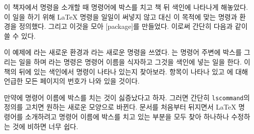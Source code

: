 이 책자에서 명령을 소개할 때 명령어에 박스를 치고 책 뒤 색인에 나타나게 해놓았다.
이 일을 하기 위해 \LaTeX{} 명령을 일일이 써넣지 않고 대신
이 목적에 맞는 명령과 환경을 정의했다. 
그리고 이것을 모아 [package]를 만들었다.
이로써 간단히 다음과 같이 쓸 수 있다.

\begin{example}
\begin{lscommand}
\end{lscommand}
\end{example}

이 예제에 라는 새로운 환경과 라는 새로운 명령을 쓰였다.
는 명령어 주변에 박스를 그리는 일을 하며
라는 명령은 명령어 이름을 식자하고 그것을 색인에 넣는 일을 한다.
이 책의 뒤에 있는 색인에서  명령이 나타나 있는지 찾아보라.  항목이 나타나 있고 에 대해 언급한 모든 페이지의 번호가 나와 있을 것이다.

만약에 명령어 이름에 박스를 치는 것이 싫증났다고 하자. 그러면 간단히 \texttt{lscommand}의 정의를 고치면 원하는 새로운 모양으로 바뀐다. 문서를 처음부터 뒤지면서 \LaTeX{} 명령어를 소개하려고 명령어 이름에 박스를 치고 있는 부분을 모두 찾아 하나하나 수정하는 것에 비하면 너무 쉽다.


